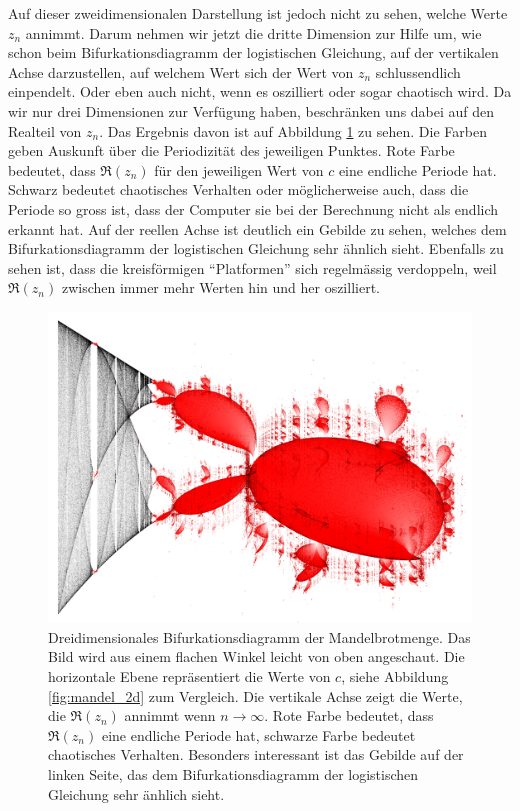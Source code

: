 Auf dieser zweidimensionalen Darstellung ist jedoch nicht zu sehen, 
welche Werte $z_n$ annimmt.
Darum nehmen wir jetzt die dritte Dimension zur Hilfe um,
wie schon beim Bifurkationsdiagramm der logistischen Gleichung,
auf der vertikalen Achse darzustellen, 
auf welchem Wert sich der Wert von $z_n$ schlussendlich einpendelt.
Oder eben auch nicht, wenn es oszilliert oder sogar
chaotisch wird. 
Da wir nur drei Dimensionen zur Verfügung haben,
beschränken uns dabei auf den Realteil von $z_n$. 
Das Ergebnis davon ist auf Abbildung 
\ref{fig:mandel_3d}
zu sehen. 
Die Farben geben Auskunft über die Periodizität des 
jeweiligen Punktes. 
Rote Farbe bedeutet, dass $\Re(z_n)$
für den jeweiligen Wert von $c$ eine endliche 
Periode hat. 
Schwarz bedeutet chaotisches Verhalten 
oder möglicherweise auch,
dass die Periode so gross ist, dass der Computer
sie bei der Berechnung nicht als endlich erkannt hat.
Auf der reellen Achse ist deutlich ein Gebilde zu sehen,
welches dem Bifurkationsdiagramm der logistischen
Gleichung sehr ähnlich sieht. 
Ebenfalls zu sehen ist, dass die kreisförmigen
``Platformen'' sich regelmässig verdoppeln, weil
$\Re(z_n)$ zwischen immer mehr Werten hin und her oszilliert.
\begin{figure}
    \includegraphics[width=\linewidth]{papers/logistic/figures/mandel_3d.png}
    \caption{
        Dreidimensionales Bifurkationsdiagramm der Mandelbrotmenge.
        Das Bild wird aus einem flachen Winkel 
        leicht von oben angeschaut. 
        Die horizontale Ebene repräsentiert die
        Werte von $c$, siehe Abbildung \ref{fig:mandel_2d}
        zum Vergleich.
        Die vertikale Achse zeigt
        die Werte, die $\Re(z_n)$ annimmt wenn 
        $n \rightarrow \infty$.
        Rote Farbe bedeutet, dass $\Re(z_n)$ eine
        endliche Periode hat, schwarze Farbe bedeutet
        chaotisches Verhalten. 
        Besonders interessant ist das Gebilde auf der 
        linken Seite, das dem Bifurkationsdiagramm
        der logistischen Gleichung sehr änhlich sieht.
    }
    \label{fig:mandel_3d}
\end{figure}
